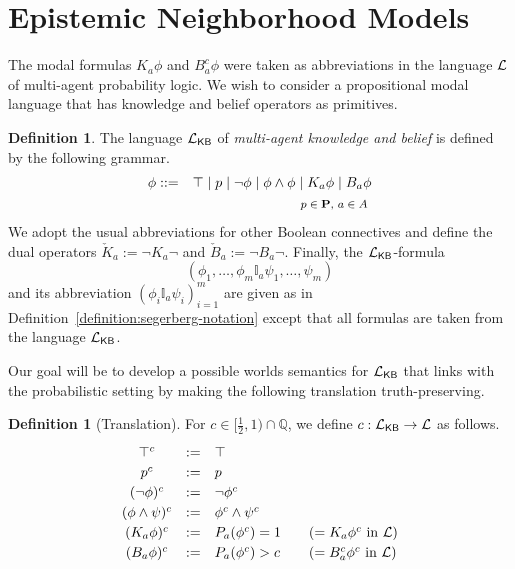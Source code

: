 \documentclass[12pt]{article}
\theoremstyle{definition}
\newtheorem{definition}[theorem]{Definition}
\newcommand{\Rat}{\mathbb{Q}}  %
\newcommand{\Prop}{{\bf P}}    %
\newcommand{\Lang}{{\cal L}}   %
\newcommand{\KB}{{\mathsf{KB}}}                        %
\begin{document}
\section{Epistemic Neighborhood Models}
\label{Section:ENM}

The modal formulas $K_a\phi$ and $B_a^c\phi$ were taken as
abbreviations in the language $\Lang$ of multi-agent probability
logic.  We wish to consider a propositional modal language that has
knowledge and belief operators as primitives.

\begin{definition}
  The language $\Lang_\KB$ of \emph{multi-agent knowledge and belief}
  is defined by the following grammar.
  \begin{eqnarray*}
    \phi & ::= & 
    \top \mid p \mid \neg\phi \mid \phi\land\phi \mid
    K_a\phi \mid B_a\phi
    \\
    &&
    \text{\footnotesize 
      $p\in\Prop$,
      $a\in A$
    }
  \end{eqnarray*}
  We adopt the usual abbreviations for other Boolean connectives and
  define the dual operators $\check K_a:=\lnot K_a\lnot$ and $\check
  B_a:=\lnot B_a\lnot$.  Finally,
  the $\Lang_\KB$-formula
  \[
  (\phi_1,\dots,\phi_m\mathbb{I}_a\psi_1,\dots,\psi_m)
  \]
  and its abbreviation
  $(\phi_i\mathbb{I}_a\psi_i)_{i=1}^m$
  are given
  as in Definition~\ref{definition:segerberg-notation} except that
  all formulas are taken from the language $\Lang_\KB$.
\end{definition}

Our goal will be to develop a possible worlds semantics for
$\Lang_\KB$ that links with the probabilistic setting by making the
following translation truth-preserving.

\begin{definition}[Translation]
  \label{definition:translation}
  For $c\in[\frac 12,1)\cap\Rat$, we define $c: \Lang_\KB \to \Lang$
  as follows.
  \[
  \renewcommand{\arraystretch}{1.2}
  \begin{array}{ccl@{\qquad}l}
    \top^c & := & \top
    \\
    p^c & := & p 
    \\
    (\neg \phi)^c & := & \neg \phi^c 
    \\
    (\phi \land \psi)^c & := & \phi^c \land \psi^c 
    \\
    (K_a\phi)^c & := & P_a(\phi^c) = 1
    & (= K_a\phi^c \text{ in } \Lang)
    \\
    (B_a\phi)^c & := & \textstyle P_a(\phi^c) > c
    & (= B_a^c\phi^c \text{ in } \Lang)
  \end{array}
  \]
\end{definition} 
\end{document}
